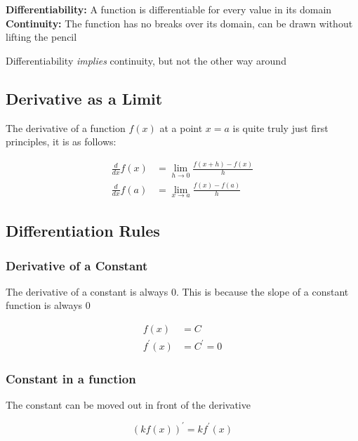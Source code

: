 \documentclass[12pt]{article}
\begin{document}
        \noindent\textbf{Differentiability: } A function is differentiable for every value in its domain
        \noindent\textbf{Continuity: } The function has no breaks over its domain, can be drawn without lifting the pencil

        \noindent Differentiability \textit{implies} continuity, but not the other way around

        \subsection{Derivative as a Limit}

        The derivative of a function $f(x)$ at a point $x = a$ is quite truly just first principles, it is as follows:

        \[
            \begin{aligned}
                \frac{d}{dx} f(x) &= \lim_{h \to 0} \frac{f(x + h) - f(x)}{h} \\
                \frac{d}{dx} f(a) &= \lim_{x \to a} \frac{f(x) - f(a)}{h}
            \end{aligned}
        \]

        \subsection{Differentiation Rules}

        \subsubsection{Derivative of a Constant}

        The derivative of a constant is always $0$. This is because the slope of a constant function is always $0$

        \[
            \begin{aligned}
                f(x) &= C \\
                f^{\prime}(x) &= C^{\prime} = 0
            \end{aligned}    
        \]

        \subsubsection{Constant in a function}

        The constant can be moved out in front of the derivative

        \[
            (k f(x))^{\prime} = k f^{\prime}(x)
        \]
\end{document}
